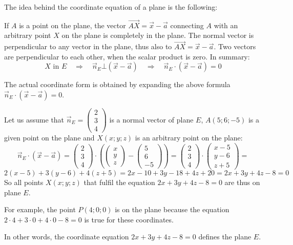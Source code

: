 \documentclass[12pt,eng]{skript_ogg}
\begin{document}
\begin{wichtig}
{\begin{tikzpicture}[line cap=round,line join=round,>=triangle 45,x=0.65cm,y=0.65cm]
\end{tikzpicture}}\parbox[T]{9cm}{The idea behind the coordinate equation of a plane is the following:

If $A$ is a point on the plane, the vector $\overrightarrow{AX}=\vec{x}-\vec{a}$ connecting $A$ with an arbitrary point $X$ on the plane is completely in the plane. The normal vector is perpendicular to any vector in the plane, thus also to $\overrightarrow{AX}=\vec{x}-\vec{a}$. Two vectors are perpendicular to each other, when the scalar product is zero. In summary:
\[X\text{ in }E\quad\Rightarrow\quad\vec{n}_E\bot(\vec{x}-\vec{a})\quad\Rightarrow\quad\vec{n}_E\cdot(\vec{x}-\vec{a})=0\]}
\end{wichtig}

The actual coordinate form is obtained by expanding the above formula $\vec{n}_E\cdot(\vec{x}-\vec{a})=0$.

\begin{beispiel}
Let us assume that $\vec{n}_E=\begin{pmatrix}2\\3\\4\end{pmatrix}$ is a normal vector of plane $E$, $A(5;6;-5)$ is a given point on the plane and $X(x;y;z)$ is an arbitrary point on the plane:
\[\vec{n}_E\cdot(\vec{x}-\vec{a})=\begin{pmatrix}2\\3\\4\end{pmatrix}\cdot\left(\begin{pmatrix}x\\y\\z\end{pmatrix}-\begin{pmatrix}5\\6\\-5\end{pmatrix}\right)=\begin{pmatrix}2\\3\\4\end{pmatrix}\cdot\begin{pmatrix}x-5\\y-6\\z+5\end{pmatrix}=\]
\[2(x-5)+3(y-6)+4(z+5)=2x-10+3y-18+4z+20=2x+3y+4z-8=0\]
So all points $X(x;y;z)$ that fulfil the equation $2x+3y+4z-8=0$ are thus on plane $E$.

For example, the point $P(4;0;0)$ is on the plane because the equation $2\cdot4+3\cdot0+4\cdot0-8=0$ is true for these coordinates.

In other words, the coordinate equation $2x+3y+4z-8=0$ defines the plane $E$.
\end{beispiel}
\end{document}
